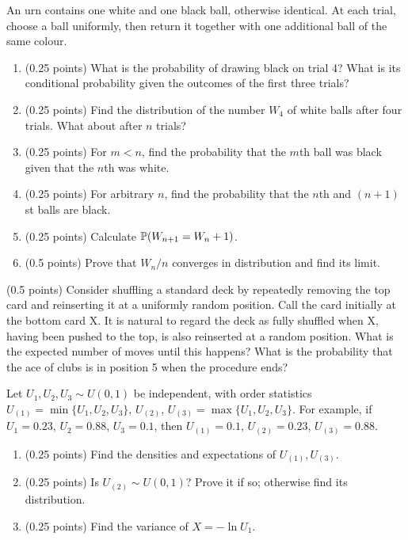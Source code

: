 \documentclass[a4paper]{report}
\begin{document}
\begin{problem}
An urn contains one white and one black ball, otherwise identical. At each trial, choose a ball uniformly, then return it together with one additional ball of the same colour.
\begin{enumerate}
\item (0.25 points) What is the probability of drawing black on trial 4? What is its conditional probability given the outcomes of the first three trials?
\item (0.25 points) Find the distribution of the number $W_4$ of white balls after four trials. What about after $n$ trials?
\item (0.25 points) For $m<n$, find the probability that the $m$th ball was black given that the $n$th was white.
\item (0.25 points) For arbitrary $n$, find the probability that the $n$th and $(n+1)$st balls are black.
\item (0.25 points) Calculate $\P(W_{n+1}=W_n+1)$.
\item (0.5 points) Prove that $W_n/n$ converges in distribution and find its limit.
\end{enumerate}
\end{problem}
\begin{problem} (0.5 points)
Consider shuffling a standard deck by repeatedly removing the top card and reinserting it at a uniformly random position. Call the card initially at the bottom card X. It is natural to regard the deck as fully shuffled when X, having been pushed to the top, is also reinserted at a random position. What is the expected number of moves until this happens? What is the probability that the ace of clubs is in position 5 when the procedure ends?
\end{problem}
\begin{problem}
Let $U_1,U_2,U_3\sim U(0,1)$ be independent, with order statistics $U_{(1)}=\min\{U_1,U_2,U_3\}$, $U_{(2)}$, $U_{(3)}=\max\{U_1,U_2,U_3\}$. For example, if $U_1=0.23$, $U_2=0.88$, $U_3=0.1$, then $U_{(1)}=0.1$, $U_{(2)}=0.23$, $U_{(3)}=0.88$.
\begin{enumerate}
\item (0.25 points) Find the densities and expectations of $U_{(1)},U_{(3)}$.
\item (0.25 points) Is $U_{(2)}\sim U(0,1)$? Prove it if so; otherwise find its distribution.
\item (0.25 points) Find the variance of $X=-\ln U_1$.
\end{enumerate}
\end{problem}
\end{document}
